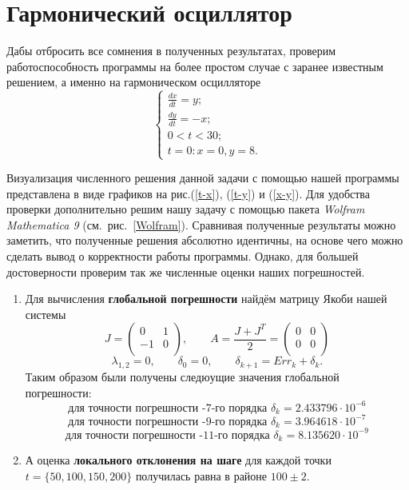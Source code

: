 \documentclass[a4paper,14pt]{article}
\begin{document}
\section{Гармонический осциллятор}
Дабы отбросить все сомнения в полученных результатах, проверим работоспособность программы на более простом случае с заранее известным решением, а именно на гармоническом осцилляторе
\[
\begin{cases}
	\frac{d x}{d t} = y;\\
	\frac{d y}{d t} = -x;\\
	0 < t < 30; \\
	t = 0: x = 0, y = 8.
\end{cases}
\]

Визуализация численного решения данной задачи с помощью нашей программы представлена в виде графиков на рис.(\ref{t-x}), (\ref{t-y}) и (\ref{x-y}). Для удобства проверки дополнительно решим нашу задачу с помощью пакета {\it Wolfram Mathematica 9} (см.~рис.~\ref{Wolfram}).
Сравнивая полученные результаты можно заметить, что полученные решения абсолютно идентичны, на основе чего можно сделать вывод о корректности работы программы. Однако, для большей достоверности проверим так же численные оценки наших погрешностей.\\
\begin{enumerate}
\item Для вычисления {\bf глобальной погрешности} найдём матрицу Якоби нашей системы
\[
J = \left(
\begin{array}{cc}
 0 & 1 \\
 -1 & 0 \\
\end{array}
\right),
\qquad
A = \frac{J + J^T}{2} =
\left(
\begin{array}{cc}
 0 & 0 \\
 0 & 0 \\
\end{array}
\right)
\]
\[
\lambda_{1,2} = 0, \qquad \delta_0 = 0, \qquad \delta_{k+1} = Err_{k} + \delta_{k}.
\]
Таким образом были получены следюущие значения глобальной погрешности:
\[
\text{для точности погрешности -7-го порядка } \delta_k =  2.433796 \cdot 10^{-6}
\]
\[
\text{для точности погрешности -9-го порядка } \delta_k =  3.964618 \cdot 10^{-7}
\]
\[
\text{для точности погрешности -11-го порядка } \delta_k =  8.135620 \cdot 10^{-9}
\]

\item А оценка {\bf локального отклонения на шаге} для каждой точки $t = \{50, 100, 150, 200\}$ получилась равна в районе $100 \pm 2$.
\end{enumerate}
\end{document}
